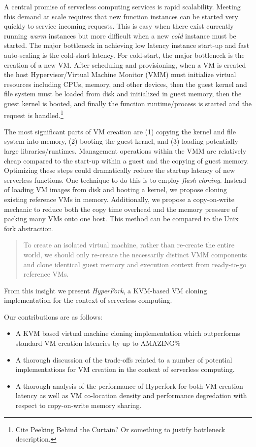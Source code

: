  A central promise of
serverless computing services is rapid scalability. Meeting this demand at
scale requires that new function instances can be started very quickly to
service incoming requests. This is easy when there exist currently running
\emph{warm} instances but more difficult when a new \emph{cold} instance must
be started. The major bottleneck in achieving low latency instance start-up and
fast auto-scaling is the cold-start latency. For cold-start, the major
bottleneck is the creation of a new VM. After scheduling and provisioning, when
a VM is created the host Hypervisor/Virtual Machine Monitor (VMM) must
initialize virtual resources including CPUs, memory, and other devices, then
the guest kernel and file system must be loaded from disk and initialized in
guest memory, then the guest kernel is booted, and finally the function
runtime/process is started and the request is handled.\footnote{Cite Peeking
Behind the Curtain? Or something to justify bottleneck description.}

 The most significant parts of VM creation are (1)
copying the kernel and file system into memory, (2) booting the guest kernel,
and (3) loading potentially large libraries/runtimes. Management operations
within the VMM are relatively cheap compared to the start-up within a guest and
the copying of guest memory. Optimizing these steps could dramatically reduce
the startup latency of new serverless functions. One technique to do this is to
employ \emph{flash cloning}. Instead of loading VM images from disk and booting
a kernel, we propose cloning existing reference VMs in memory. Additionally, we
propose a copy-on-write mechanic to reduce both the copy time overhead and the
memory pressure of packing many VMs onto one host. This method can be compared
to the Unix fork abstraction.


\begin{quote} To create an isolated virtual machine, rather than re-create the
entire world, we should only re-create the necessarily distinct VMM components
and clone identical guest memory and execution context from ready-to-go
reference VMs.
\end{quote}

From this insight we present \emph{HyperFork}, a KVM-based VM cloning
implementation for the context of serverless computing.

 Our contributions are as follows: \begin{itemize}
\item A KVM based virtual machine cloning implementation which outperforms
standard VM creation latencies by up to AMAZING\%
\item A thorough discussion of the trade-offs related to a number of potential
implementations for VM creation in the context of serverless computing.
\item A thorough analysis of the performance of Hyperfork for both VM creation
latency as well as VM co-location density and performance degredation with
respect to copy-on-write memory sharing.
\end{itemize}
